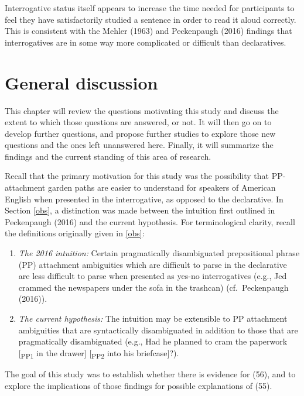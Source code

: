 \documentclass[12pt,oneside]{book}
\begin{document}
Interrogative status itself appears to increase the time needed for participants to feel they have satisfactorily studied a sentence in order to read it aloud correctly. This is consistent with the Mehler (1963) and Peckenpaugh (2016) findings that interrogatives are in some way more complicated or difficult than declaratives.

\clearpage

\hypertarget{general-discussion}{%
\chapter{General discussion}\label{general-discussion}}

This chapter will review the questions motivating this study and discuss the extent to which those questions are answered, or not. It will then go on to develop further questions, and propose further studies to explore those new questions and the ones left unanswered here. Finally, it will summarize the findings and the current standing of this area of research.

Recall that the primary motivation for this study was the possibility that PP-attachment garden paths are easier to understand for speakers of American English when presented in the interrogative, as opposed to the declarative. In Section \ref{obs}, a distinction was made between the intuition first outlined in Peckenpaugh (2016) and the current hypothesis. For terminological clarity, recall the definitions originally given in \ref{obs}:

\begin{enumerate}
\def\labelenumi{(\arabic{enumi})}
\setcounter{enumi}{54}
\item
  \emph{The 2016 intuition:} Certain pragmatically disambiguated prepositional phrase (PP) attachment ambiguities which are difficult to parse in the declarative are less difficult to parse when presented as yes-no interrogatives (e.g., Jed crammed the newspapers under the sofa in the trashcan) (cf.~Peckenpaugh (2016)).
\item
  \emph{The current hypothesis:} The intuition may be extensible to PP attachment ambiguities that are syntactically disambiguated in addition to those that are pragmatically disambiguated (e.g., Had he planned to cram the paperwork {[}\textsubscript{PP1} in the drawer{]} {[}\textsubscript{PP2} into his briefcase{]}?).
\end{enumerate}

The goal of this study was to establish whether there is evidence for (56), and to explore the implications of those findings for possible explanations of (55).
\end{document}
